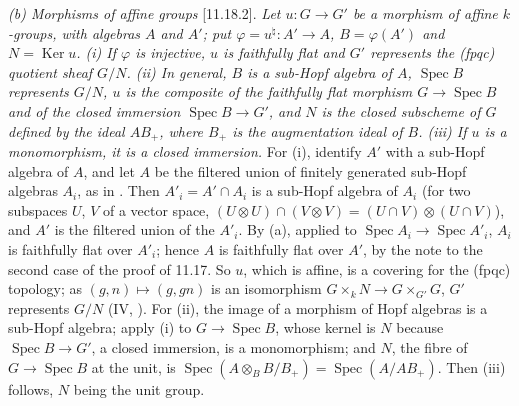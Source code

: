 \par\smallskip\noindent{}\label{thm:sga3-VIB-11.18.2}%
\textit{(b) Morphisms of affine groups} [11.18.2]. \emph{Let \(u:G\to G'\) be a morphism
of affine \(k\)-groups, with algebras \(A\) and \(A'\); put \(\varphi=u^\natural:A'\to A\),
\(B=\varphi(A')\) and \(N=\operatorname{Ker}u\). \textup{(i)} If \(\varphi\) is injective,
\(u\) is faithfully flat and \(G'\) represents the \textup{(fpqc)} quotient sheaf \(G/N\).
\textup{(ii)} In general, \(B\) is a sub-Hopf algebra of \(A\), \(\operatorname{Spec}B\)
represents \(G/N\), \(u\) is the composite of the faithfully flat morphism
\(G\to\operatorname{Spec}B\) and of the closed immersion \(\operatorname{Spec}B\to G'\),
and \(N\) is the closed subscheme of \(G\) defined by the ideal \(AB_+\), where \(B_+\) is
the augmentation ideal of \(B\). \textup{(iii)} If \(u\) is a monomorphism, it is a closed
immersion.} For (i), identify \(A'\) with a sub-Hopf algebra of \(A\), and let \(A\) be the
filtered union of finitely generated sub-Hopf algebras \(A_i\), as in
. Then \(A'_i=A'\cap A_i\) is a sub-Hopf algebra
of \(A_i\) (for two subspaces \(U\), \(V\) of a vector space,
\((U\otimes U)\cap(V\otimes V)=(U\cap V)\otimes(U\cap V)\)), and \(A'\) is the filtered
union of the \(A'_i\). By (a), applied to \(\operatorname{Spec}A_i\to\operatorname{Spec}A'_i\),
\(A_i\) is faithfully flat over \(A'_i\); hence \(A\) is faithfully flat over \(A'\), by the
note to the second case of the proof of 11.17. So \(u\), which is affine, is a covering for
the \textup{(fpqc)} topology; as \((g,n)\mapsto(g,gn)\) is an isomorphism
\(G\times_kN\to G\times_{G'}G\), \(G'\) represents \(G/N\)
\textup{(IV, )}. For (ii), the image of a
morphism of Hopf algebras is a sub-Hopf algebra; apply (i) to \(G\to\operatorname{Spec}B\),
whose kernel is \(N\) because \(\operatorname{Spec}B\to G'\), a closed immersion, is a
monomorphism; and \(N\), the fibre of \(G\to\operatorname{Spec}B\) at the unit, is
\(\operatorname{Spec}(A\otimes_BB/B_+)=\operatorname{Spec}(A/AB_+)\). Then (iii) follows,
\(N\) being the unit group.


